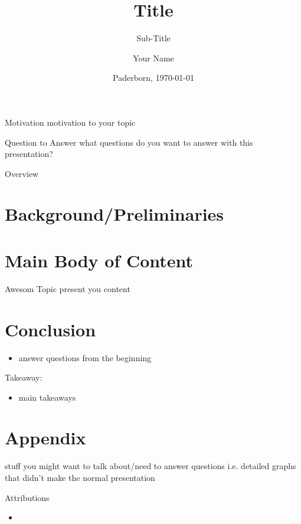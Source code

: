 \documentclass[
]{beamer}
\title{Title}
\subtitle{Sub-Title}
\institute{Research Group XYZ}
\author{Your Name}
\date{Paderborn, \today}
\begin{document}
\begin{frame}[plain]
    \titlepage%
\end{frame}

\begin{preface}

\begin{frame}{Motivation}
    motivation to your topic
\end{frame}

\begin{frame}{Question to Answer}
    what questions do you want to answer with this presentation?
\end{frame}

\begin{frame}{Overview}
    \tableofcontents
\end{frame}

\end{preface}

\setcounter{framenumber}{0}

\section{Background/Preliminaries}\sectionframe%

\section{Main Body of Content}\sectionframe%

\begin{frame}{Awesom Topic}
    present you content
\end{frame}

\section{Conclusion}

\begin{frame}{\secname}
    \begin{itemize}
        \item answer questions from the beginning
    \end{itemize}
    \vspace*{1em}
    Takeaway:
    \begin{itemize}
        \item main takeaways
    \end{itemize}
\end{frame}

\section*{Appendix}\sectionframe%

\begin{frame}{\secname}
    stuff you might want to talk about/need to answer questions
    i.e. detailed graphs that didn't make the normal presentation
\end{frame}

\begin{frame}{Attributions}
\begin{itemize}
    \item 
\end{itemize}
\end{frame}
\end{document}
